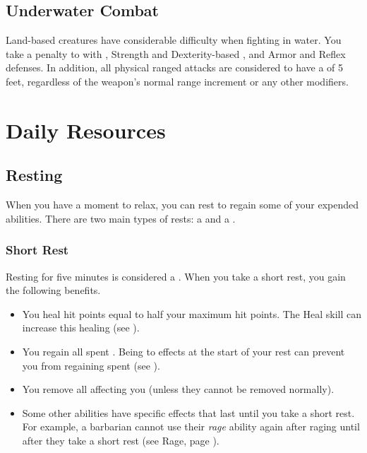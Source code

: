    \subsection{Underwater Combat}\label{Underwater Combat}
        Land-based creatures have considerable difficulty when fighting in water.
        You take a  penalty to  with , Strength and Dexterity-based , and Armor and Reflex defenses.
        In addition, all physical ranged attacks are considered to have a  of 5 feet, regardless of the weapon's normal range increment or any other modifiers.

\section{Daily Resources}

    \subsection{Resting}\label{Resting}
        When you have a moment to relax, you can rest to regain some of your expended abilities.
        There are two main types of rests: a  and a .

        \subsubsection{Short Rest}\label{Short Rest}
            Resting for five minutes is considered a .
            When you take a short rest, you gain the following benefits.
            \begin{itemize}
                \item You heal hit points equal to half your maximum hit points.
                    The Heal skill can increase this healing (see ).
                \item You regain all spent .
                    Being  to effects at the start of your rest can prevent you from regaining spent  (see ).
                \item You remove all  affecting you (unless they cannot be removed normally).
                \item Some other abilities have specific effects that last until you take a short rest.
                    For example, a barbarian cannot use their \textit{rage} ability again after raging until after they take a short rest (see Rage, page ).
            \end{itemize}

